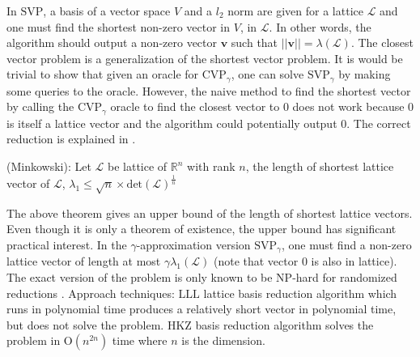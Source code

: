 In $\mathrm{SVP}$, a basis of a vector space $V$ and a $l_2$ norm are given for a lattice $\mathcal{L}$ and one must find the shortest non-zero vector in $V$, in $\mathcal{L}$. In other words, the algorithm should output a non-zero vector $\textbf{v}$ such that $||\textbf{v}||=\lambda (\mathcal{L})$. The closest vector problem is a generalization of the shortest vector problem. It is would be trivial to show that given an oracle for $\text{CVP}_{\gamma }$, one can solve $\text{SVP}_{\gamma }$ by making some queries to the oracle. However, the naive method to find the shortest vector by calling the $\text{CVP}_{\gamma }$ oracle to find the closest vector to $0$ does not work because $0$ is itself a lattice vector and the algorithm could potentially output $0$. The correct reduction is explained in \cite{Goldreich:1999:ASL:329343.329349}.


\begin{theorem}
\normalfont
(Minkowski):
Let $\mathcal{L}$ be lattice of $\mathbb{R}^n$ with rank $n$, the length of shortest lattice vector of $\mathcal{L}$, $\lambda_1 \le \sqrt{n} \times \text{det}(\mathcal{L})^{\frac{1}{n}}$
\end{theorem}

The above theorem gives an upper bound of the length of shortest lattice vectors. Even though it is only a theorem of existence, the upper bound has significant practical interest. In the $\gamma$-approximation version $\text{SVP}_{\gamma}$, one must find a non-zero lattice vector of length at most $\gamma \lambda_1 (\mathcal{L})$ (note that vector $0$ is also in lattice). The exact version of the problem is only known to be NP-hard for randomized reductions \cite{Ajtai:1998:SVP:276698.276705} \cite{1366232}. Approach techniques: $\mathrm{LLL}$ lattice basis reduction algorithm which runs in polynomial time produces a relatively short vector in polynomial time, but does not solve the problem. HKZ basis reduction algorithm solves the problem in $\text{O}(n^{2n})$ time where $n$ is the dimension.



